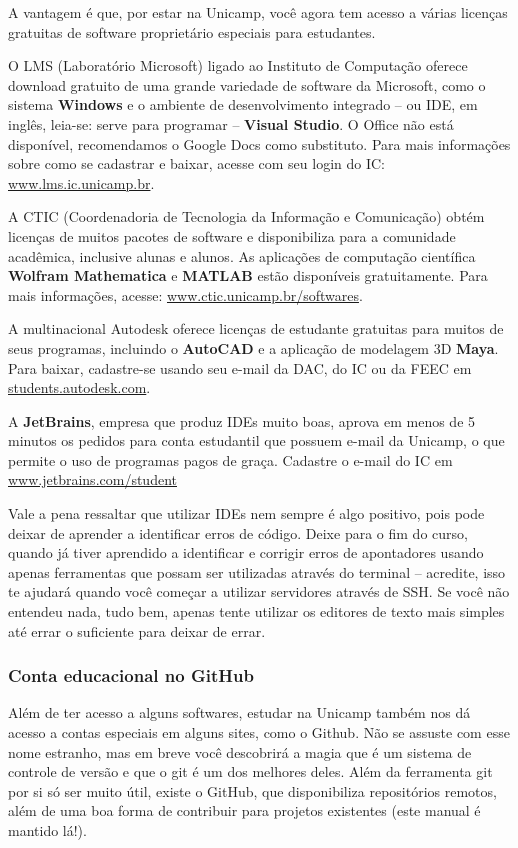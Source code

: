 A vantagem é que, por estar na Unicamp, você agora tem acesso a várias licenças
gratuitas de software proprietário especiais para estudantes.

O LMS (Laboratório Microsoft) ligado ao Instituto de Computação oferece
download gratuito de uma grande variedade de software da Microsoft, como o
sistema \textbf{Windows} e o ambiente de desenvolvimento integrado -- ou IDE,
em inglês, leia-se: serve para programar -- \textbf{Visual Studio}. O Office
não está disponível, recomendamos o Google Docs como substituto. Para mais
informações sobre como se cadastrar e baixar, acesse com seu login do IC:
\url{www.lms.ic.unicamp.br}.

A CTIC (Coordenadoria de Tecnologia da Informação e Comunicação) obtém licenças
de muitos pacotes de software e disponibiliza para a comunidade acadêmica,
inclusive alunas e alunos. As aplicações de computação científica
\textbf{Wolfram Mathematica} e \textbf{MATLAB} estão disponíveis gratuitamente.
Para mais informações, acesse: \url{www.ctic.unicamp.br/softwares}.

A multinacional Autodesk oferece licenças de estudante gratuitas para muitos de
seus programas, incluindo o \textbf{AutoCAD} e a aplicação de modelagem 3D
\textbf{Maya}. Para baixar, cadastre-se usando seu e-mail da DAC, do IC ou da
FEEC em \url{students.autodesk.com}.

A \textbf{JetBrains}, empresa que produz IDEs muito boas, aprova em menos de 5
minutos os pedidos para conta estudantil que possuem e-mail da Unicamp, o que
permite o uso de programas pagos de graça. Cadastre o e-mail do IC em
\url{www.jetbrains.com/student}

Vale a pena ressaltar que utilizar IDEs nem sempre é algo positivo, pois pode
deixar de aprender a identificar erros de código. Deixe para o fim do curso,
quando já tiver aprendido a identificar e corrigir erros de apontadores usando
apenas ferramentas que possam ser utilizadas através do terminal -- acredite,
isso te ajudará quando você começar a utilizar servidores através de SSH.
Se você não entendeu nada, tudo bem, apenas tente utilizar os editores de texto
mais simples até errar o suficiente para deixar de errar.

\subsubsection{Conta educacional no GitHub}

Além de ter acesso a alguns softwares, estudar na Unicamp também nos dá acesso
a contas especiais em alguns sites, como o Github. Não se assuste com esse nome
estranho, mas em breve você descobrirá a magia que é um sistema de controle de
versão e que o git é um dos melhores deles. Além da ferramenta git por si só
ser muito útil, existe o GitHub, que disponibiliza repositórios remotos, além
de uma boa forma de contribuir para projetos existentes (este manual é mantido
lá!).

